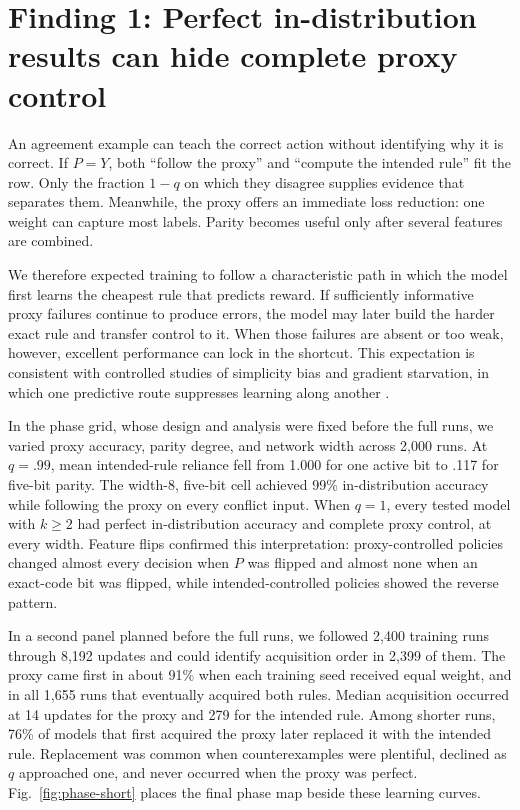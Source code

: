 \documentclass[11pt,a4paper]{article}
\newcommand{\fig}[1]{Fig.~\ref{#1}}
\begin{document}
\section*{Finding 1: Perfect in-distribution results can hide complete proxy control}

An agreement example can teach the correct action without identifying why it is correct. If $P=Y$, both ``follow the proxy'' and ``compute the intended rule'' fit the row. Only the fraction $1-q$ on which they disagree supplies evidence that separates them. Meanwhile, the proxy offers an immediate loss reduction: one weight can capture most labels. Parity becomes useful only after several features are combined.

We therefore expected training to follow a characteristic path in which the model first learns the cheapest rule that predicts reward. If sufficiently informative proxy failures continue to produce errors, the model may later build the harder exact rule and transfer control to it. When those failures are absent or too weak, however, excellent performance can lock in the shortcut. This expectation is consistent with controlled studies of simplicity bias and gradient starvation, in which one predictive route suppresses learning along another \citep{shah2020pitfalls,pezeshki2021gradient}.

In the phase grid, whose design and analysis were fixed before the full runs, we varied proxy accuracy, parity degree, and network width across 2,000 runs. At $q=.99$, mean intended-rule reliance fell from 1.000 for one active bit to .117 for five-bit parity. The width-8, five-bit cell achieved 99\% in-distribution accuracy while following the proxy on every conflict input. When $q=1$, every tested model with $k\geq2$ had perfect in-distribution accuracy and complete proxy control, at every width. Feature flips confirmed this interpretation: proxy-controlled policies changed almost every decision when $P$ was flipped and almost none when an exact-code bit was flipped, while intended-controlled policies showed the reverse pattern.

In a second panel planned before the full runs, we followed 2,400 training runs through 8,192 updates and could identify acquisition order in 2,399 of them. The proxy came first in about 91\% when each training seed received equal weight, and in all 1,655 runs that eventually acquired both rules. Median acquisition occurred at 14 updates for the proxy and 279 for the intended rule. Among shorter runs, 76\% of models that first acquired the proxy later replaced it with the intended rule. Replacement was common when counterexamples were plentiful, declined as $q$ approached one, and never occurred when the proxy was perfect. \fig{fig:phase-short} places the final phase map beside these learning curves.
\end{document}
